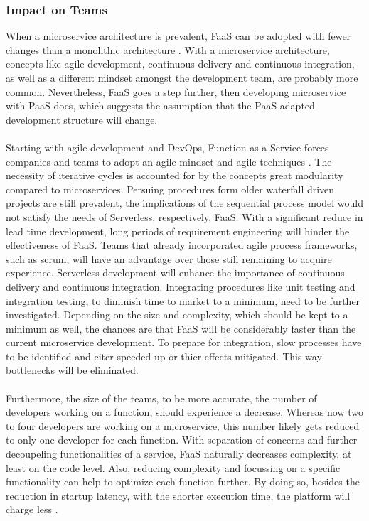 \documentclass[11pt]{article}
\begin{document}
\subsubsection{Impact on Teams}
When a microservice architecture is prevalent, FaaS can be adopted with fewer changes than a monolithic architecture \cite{fox2017status}. With a microservice architecture, concepts like agile development, continuous delivery and continuous integration, as well as a different mindset amongst the development team, are probably more common. Nevertheless, FaaS goes a step further, then developing microservice with PaaS does, which suggests the assumption that the PaaS-adapted development structure will change.\\\\ Starting with agile development and \glqq DevOps\grqq{}, Function as a Service forces companies and teams to adopt an agile mindset and agile techniques \cite{benlian2018transformative}. The necessity of iterative cycles is accounted for by the concepts great modularity compared to microservices. Persuing procedures form older waterfall driven projects are still prevalent, the implications of the sequential process model would not satisfy the needs of Serverless, respectively, FaaS. With a significant reduce in lead time development, long periods of requirement engineering will hinder the effectiveness of FaaS. Teams that already incorporated agile process frameworks, such as scrum, will have an advantage over those still remaining to acquire experience. Serverless development will enhance the importance of continuous delivery and continuous integration. Integrating procedures like unit testing and integration testing, to diminish time to market to a minimum, need to be further investigated. Depending on the size and complexity, which should be kept to a minimum as well, the chances are that FaaS will be considerably faster than the current microservice development. To prepare for integration, slow processes have to be identified and eiter speeded up or thier effects mitigated. This way bottlenecks will be eliminated.\\\\ Furthermore, the size of the teams, to be more accurate, the number of developers working on a function, should experience a decrease. Whereas now two to four developers are working on a microservice, this number likely gets reduced to only one developer for each function. With separation of concerns and further decoupeling functionalities of a service, FaaS naturally decreases complexity, at least on the code level. Also, reducing complexity and focussing on a specific functionality can help to optimize each function further. By doing so, besides the reduction in startup latency, with the shorter execution time, the platform will charge less \cite{shafiei2020serverless}.\\\\ 
\end{document}
